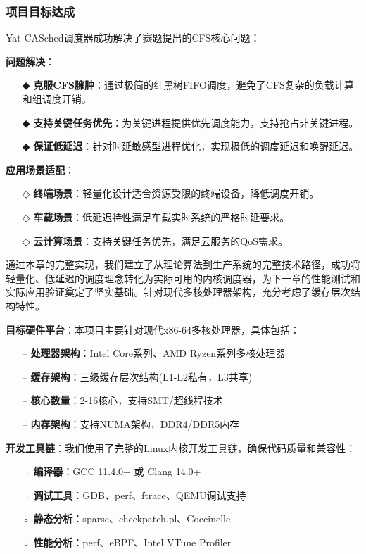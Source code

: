 \subsubsection{项目目标达成}

Yat-CASched调度器成功解决了赛题提出的CFS核心问题：

\textbf{问题解决}：
\begin{itemize}
    \item[◆] \textbf{克服CFS臃肿}：通过极简的红黑树FIFO调度，避免了CFS复杂的负载计算和组调度开销。
    \item[◆] \textbf{支持关键任务优先}：为关键进程提供优先调度能力，支持抢占非关键进程。
    \item[◆] \textbf{保证低延迟}：针对时延敏感型进程优化，实现极低的调度延迟和唤醒延迟。
\end{itemize}

\textbf{应用场景适配}：
\begin{itemize}
    \item[◇] \textbf{终端场景}：轻量化设计适合资源受限的终端设备，降低调度开销。
    \item[◇] \textbf{车载场景}：低延迟特性满足车载实时系统的严格时延要求。
    \item[◇] \textbf{云计算场景}：支持关键任务优先，满足云服务的QoS需求。
\end{itemize}

通过本章的完整实现，我们建立了从理论算法到生产系统的完整技术路径，成功将轻量化、低延迟的调度理念转化为实际可用的内核调度器，为下一章的性能测试和实际应用验证奠定了坚实基础。针对现代多核处理器架构，充分考虑了缓存层次结构特性。

\textbf{目标硬件平台}：本项目主要针对现代x86-64多核处理器，具体包括：
\begin{itemize}
    \item[--] \textbf{处理器架构}：Intel Core系列、AMD Ryzen系列多核处理器
    \item[--] \textbf{缓存架构}：三级缓存层次结构(L1-L2私有，L3共享)
    \item[--] \textbf{核心数量}：2-16核心，支持SMT/超线程技术
    \item[--] \textbf{内存架构}：支持NUMA架构，DDR4/DDR5内存
\end{itemize}

\textbf{开发工具链}：我们使用了完整的Linux内核开发工具链，确保代码质量和兼容性：
\begin{itemize}
    \item[◦] \textbf{编译器}：GCC 11.4.0+ 或 Clang 14.0+
    \item[◦] \textbf{调试工具}：GDB、perf、ftrace、QEMU调试支持
    \item[◦] \textbf{静态分析}：sparse、checkpatch.pl、Coccinelle
    \item[◦] \textbf{性能分析}：perf、eBPF、Intel VTune Profiler
\end{itemize}


